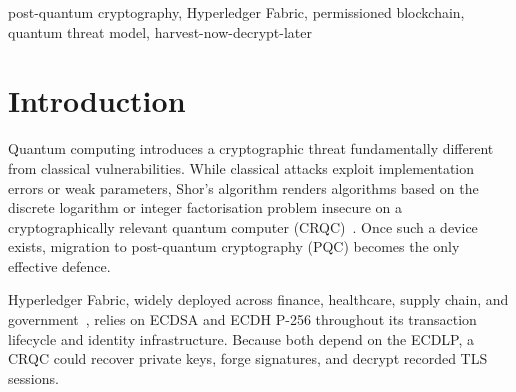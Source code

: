 \documentclass[conference]{IEEEtran}
\begin{document}
\begin{IEEEkeywords}post-quantum cryptography, Hyperledger Fabric, permissioned blockchain, quantum threat model, harvest-now-decrypt-later
\end{IEEEkeywords}

\section{Introduction}
\label{sec:tm_intro}
Quantum computing introduces a cryptographic threat fundamentally different
from classical vulnerabilities. While classical attacks exploit implementation
errors or weak parameters, Shor's algorithm renders algorithms based on the
discrete logarithm or integer factorisation problem insecure on a
cryptographically relevant quantum computer (CRQC)~\cite{shor1994}. Once such
a device exists, migration to post-quantum cryptography (PQC) becomes the only
effective defence.

Hyperledger Fabric, widely deployed across finance, healthcare, supply chain,
and government~\cite{androulaki2018}, relies on ECDSA and ECDH P-256
throughout its transaction lifecycle and identity infrastructure. Because both
depend on the ECDLP, a CRQC could recover private keys, forge signatures, and
decrypt recorded TLS sessions.
\end{document}
